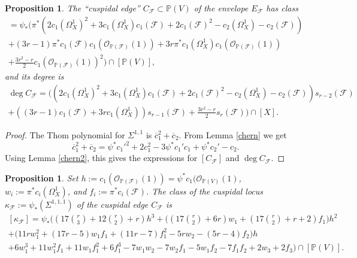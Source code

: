 \documentclass[reqno]{amsart}
\newtheorem{prop}[lemma]{Proposition}
\theoremstyle{definition}
\theoremstyle{remark}
\begin{document}
\begin{prop}\label{cusp}
The ``cuspidal edge'' $C_\mathcal F\subset \mathbb P(V)$ of the envelope $E_\mathcal F$ has class
\begin{multline*} [C_\mathcal F]=\psi_*
\bigl(\pi^*(2c_1(\Omega^1_X)^2+3c_1(\Omega^1_X)c_1(\mathcal F)+2c_1(\mathcal F)^2
-c_2(\Omega^1_X)-c_2(\mathcal F))\\
+(3r-1)\pi^*c_1(\mathcal F)c_1(\mathcal O_{\mathbb P(\mathcal F)}(1))
+3r\pi^*c_1(\Omega^1_X)c_1(\mathcal O_{\mathbb P(\mathcal F)}(1))\\+\frac{3r^2-r}2 c_1(\mathcal O_{\mathbb P(\mathcal F)}(1))^2\bigr)\cap [\mathbb P(V)],
\end{multline*}
and its degree is
\begin{multline*}
\deg C_\mathcal F=\bigl((2c_1(\Omega^1_X)^2+3c_1(\Omega^1_X)c_1(\mathcal F)+2c_1(\mathcal F)^2
-c_2(\Omega^1_X)-c_2(\mathcal F))s_{r-2}(\mathcal F)\\
+((3r-1)c_1(\mathcal F)
+3rc_1(\Omega^1_X))s_{r-1}(\mathcal F)+\frac{3r^2-r}2 s_r(\mathcal F)\bigr)\cap [X].
\end{multline*}

\end{prop}

\begin{proof}
The Thom polynomial for $\Sigma^{1,1}$ is $\overline c_1^2+\overline c_2$. From Lemma \ref{chern} we get
\[\overline c_1^2+\overline c_2=\psi^*{c_1'}^2 + 2c_1^2-3\psi^*c_1'c_1+\psi^*c_2'-c_2.\]
Using Lemma \ref{chern2}, this gives the expressions for $[C_\mathcal F]$ and $\deg C_\mathcal F$.
\end{proof}

\begin{prop}\label{cuspscusp}
Set $h:=c_1(\mathcal O_{\mathbb P(\mathcal F)}(1))=\psi^*c_1(\mathcal O_{\mathbb P(V)}(1)$, $w_i:=\pi^*c_i(\Omega^1_X)$, and $f_i:=\pi^*c_i(\mathcal F)$. 
The class of the cuspidal locus $\kappa_\mathcal F:=\psi_*(\Sigma^{1,1,1})$ of the cuspidal edge $C_\mathcal F$ is
\begin{multline*}\textstyle
[\kappa_\mathcal F]=\psi_*\bigl(
(17\binom{r}3 +12\binom{r}2 +r)h^3
+\bigl((17\binom{r}2 + 6r)w_1
 \textstyle +  (17\binom{r}2 +r +2)f_1\bigr)h^2\\
 +\bigl(11rw_1^2+(17r-5)w_1f_1+(11r-7)f_1^2-5rw_2-(5r-4)f_2\bigr)h\\
 +6w_1^3+11w_1^2f_1+11w_1f_1^2+6f_1^3-7w_1w_2
 -7w_2f_1-5w_1f_2-7f_1f_2+2w_3+2f_3\bigr)\cap [\mathbb P(V)].
\end{multline*}
\end{prop}
\end{document}
